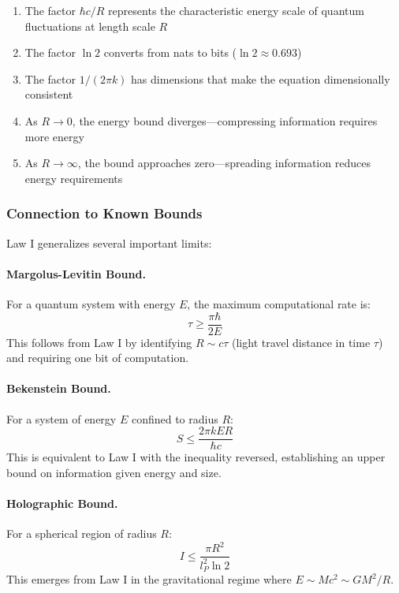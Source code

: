 \documentclass[11pt,a4paper]{article}
\theoremstyle{plain}
\theoremstyle{definition}
\theoremstyle{remark}
\begin{document}
\begin{enumerate}[leftmargin=*]
\item The factor $\hbar c/R$ represents the characteristic energy scale of quantum fluctuations at length scale $R$
\item The factor $\ln 2$ converts from nats to bits ($\ln 2 \approx 0.693$)
\item The factor $1/(2\pi k)$ has dimensions that make the equation dimensionally consistent
\item As $R\to 0$, the energy bound diverges—compressing information requires more energy
\item As $R\to\infty$, the bound approaches zero—spreading information reduces energy requirements
\end{enumerate}

\subsubsection{Connection to Known Bounds}

Law I generalizes several important limits:

\paragraph{Margolus-Levitin Bound.} For a quantum system with energy $E$, the maximum computational rate is:
\begin{equation}
\tau \geq \frac{\pi\hbar}{2E}
\end{equation}
This follows from Law I by identifying $R \sim c\tau$ (light travel distance in time $\tau$) and requiring one bit of computation.

\paragraph{Bekenstein Bound.} For a system of energy $E$ confined to radius $R$:
\begin{equation}
S \leq \frac{2\pi kER}{\hbar c}
\end{equation}
This is equivalent to Law I with the inequality reversed, establishing an upper bound on information given energy and size.

\paragraph{Holographic Bound.} For a spherical region of radius $R$:
\begin{equation}
I \leq \frac{\pi R^2}{l_P^2\ln 2}
\end{equation}
This emerges from Law I in the gravitational regime where $E \sim Mc^2 \sim GM^2/R$.
\end{document}

